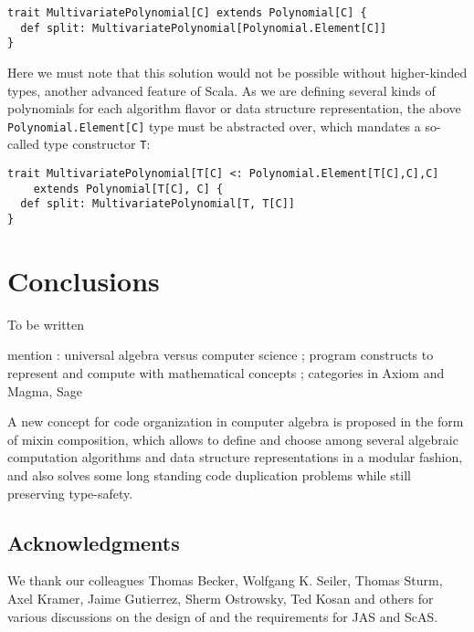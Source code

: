 \documentclass{llncs}
\newcommand{\code}[1]{\texttt{#1}}
\begin{document}
\begin{verbatim}
trait MultivariatePolynomial[C] extends Polynomial[C] {
  def split: MultivariatePolynomial[Polynomial.Element[C]]
}
\end{verbatim}

Here we must note that this solution would not be possible without higher-kinded
types, another advanced feature of Scala. As we are defining several kinds of
polynomials for each algorithm flavor or data structure representation, the
above \code{Polynomial.Element[C]} type must be abstracted over, which mandates a
so-called type constructor \code{T}:

\begin{verbatim}
trait MultivariatePolynomial[T[C] <: Polynomial.Element[T[C],C],C]
    extends Polynomial[T[C], C] {
  def split: MultivariatePolynomial[T, T[C]]
}
\end{verbatim}

\section{Conclusions} %

To be written

mention :
universal algebra versus computer science ;
program constructs to represent and compute with mathematical concepts ;
categories in Axiom and Magma, Sage

A new concept for code organization in computer algebra is proposed in the form
of mixin composition, which allows to define and choose among several algebraic
computation algorithms and data structure representations in a modular fashion,
and also solves some long standing code duplication problems while still
preserving type-safety.

\subsection*{Acknowledgments} %

We thank our colleagues Thomas Becker, Wolfgang K. Seiler, Thomas
Sturm, Axel Kramer, Jaime Gutierrez, Sherm Ostrowsky, Ted Kosan and
others for various discussions on the design of and the requirements
for JAS and ScAS. 




\end{document}
